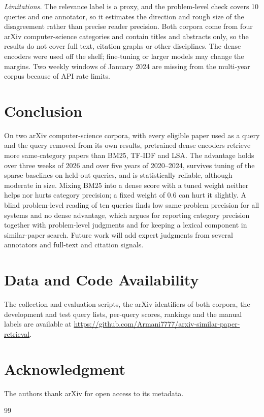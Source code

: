 \documentclass[conference]{IEEEtran}
\begin{document}
\textit{Limitations.} The relevance label is a proxy, and the problem-level check covers 10 queries and one annotator, so it estimates the direction and rough size of the disagreement rather than precise reader precision. Both corpora come from four arXiv computer-science categories and contain titles and abstracts only, so the results do not cover full text, citation graphs or other disciplines. The dense encoders were used off the shelf; fine-tuning or larger models may change the margins. Two weekly windows of January 2024 are missing from the multi-year corpus because of API rate limits.

\section{Conclusion}

On two arXiv computer-science corpora, with every eligible paper used as a query and the query removed from its own results, pretrained dense encoders retrieve more same-category papers than BM25, TF-IDF and LSA. The advantage holds over three weeks of 2026 and over five years of 2020--2024, survives tuning of the sparse baselines on held-out queries, and is statistically reliable, although moderate in size. Mixing BM25 into a dense score with a tuned weight neither helps nor hurts category precision; a fixed weight of 0.6 can hurt it slightly. A blind problem-level reading of ten queries finds low same-problem precision for all systems and no dense advantage, which argues for reporting category precision together with problem-level judgments and for keeping a lexical component in similar-paper search. Future work will add expert judgments from several annotators and full-text and citation signals.

\section*{Data and Code Availability}
\label{sec:availability}
The collection and evaluation scripts, the arXiv identifiers of both corpora, the development and test query lists, per-query scores, rankings and the manual labels are available at \url{https://github.com/Armani7777/arxiv-similar-paper-retrieval}.

\section*{Acknowledgment}
The authors thank arXiv for open access to its metadata. 

\begin{thebibliography}{99}

\end{thebibliography}
\end{document}
